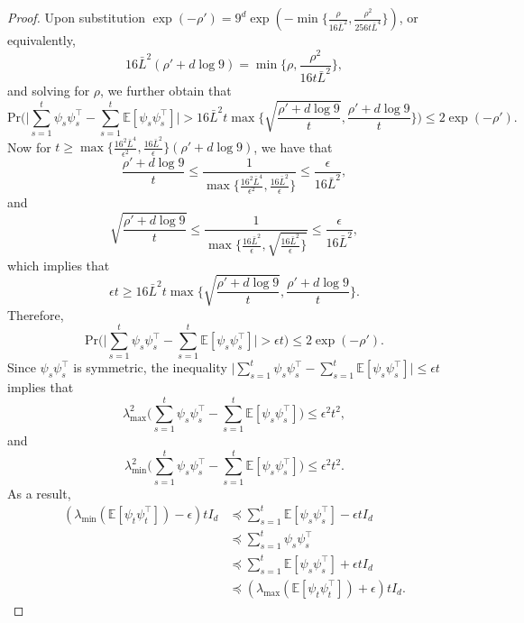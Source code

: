 \documentclass[11pt]{article}
\theoremstyle{plain}
\theoremstyle{definition}
\theoremstyle{remark}
\begin{document}
\begin{proof}
Upon substitution $\exp(-\rho')=9^d\exp (-\min \{\frac{\rho}{16 \bar L^2},\frac{\rho^2}{256t \bar L^4}\})$, or equivalently,
\[
16 \bar L^2 (\rho'+d \log 9)=\min\bigg \{\rho,\frac{\rho^2}{16 t \bar L^2} \bigg \},
\]
and solving for $\rho$, we further obtain that
\[
\mathrm{Pr}\bigg(\bigg|\sum_{s=1}^t \psi_s \psi_s^{\top} - \sum_{s=1}^t  \mathbb{E}[\psi_s \psi_s^{\top}]\bigg|> 16 \bar{L}^2 t\max \bigg \{\sqrt{\frac{\rho'+d \log 9}{t}},\frac{\rho'+d \log 9}{t}\bigg \}\bigg)\leq 2\exp(-\rho').
\]
Now for $t \geq \max \{\frac{16^2\bar{L}^4}{\epsilon^2}, \frac{16\bar{L}^2}{\epsilon}\}(\rho' +d \log 9)$, we have that
\[
\frac{\rho'+d\log 9}{t} \leq \frac{1}{\max \Big\{\frac{16^2 \bar L^4}{\epsilon^2},\frac{16 \bar L^2}{\epsilon}\Big\}}\leq \frac{\epsilon}{16 \bar L^2},
\]
and
\[
\sqrt{\frac{\rho'+d\log 9}{t}} \leq \frac{1}{\max \Big \{\frac{16 \bar L^2}{\epsilon},\sqrt{\frac{16 \bar L^2}{\epsilon}\Big\}}}\leq \frac{\epsilon}{16 \bar L^2},
\]
which implies that
\[
\epsilon t \geq 16 \bar{L}^2 t\max \bigg\{\sqrt{\frac{\rho'+d \log 9}{t}},\frac{\rho'+d \log 9}{t}\bigg\}.
\]
Therefore,
\[
\mathrm{Pr}\bigg(\bigg|\sum_{s=1}^t \psi_s \psi_s^{\top} - \sum_{s=1}^t  \mathbb{E}[\psi_s \psi_s^{\top}]\bigg|> \epsilon t\bigg)\leq 2\exp(-\rho').
\]
Since $\psi_s \psi_s^{\top}$ is symmetric, the inequality $\big|\sum_{s=1}^t \psi_s \psi_s^{\top} - \sum_{s=1}^t  \mathbb{E}[\psi_s \psi_s^{\top}]\big|\leq \epsilon t$ implies that
\[
\lambda_{\max}^2 \bigg (\sum_{s=1}^t \psi_s \psi_s^{\top} - \sum_{s=1}^t  \mathbb{E}[\psi_s \psi_s^{\top}]\bigg )\leq \epsilon^2 t^2,
\]
and
\[
\lambda_{\min}^2 \bigg (\sum_{s=1}^t \psi_s \psi_s^{\top} - \sum_{s=1}^t  \mathbb{E}[\psi_s \psi_s^{\top}]\bigg )\leq \epsilon^2 t^2.
\]
As a result, 
\begin{align*}
(\lambda_{\min}(\mathbb{E}[\psi_t \psi_t^{\top}])- \epsilon)tI_d&\preceq \sum_{s=1}^t\mathbb{E}[\psi_s \psi_s^{\top}]-\epsilon t I_d\\
&\preceq \sum_{s=1}^t \psi_s \psi_s^{\top}\\
&\preceq \sum_{s=1}^t\mathbb{E}[\psi_s \psi_s^{\top}] + \epsilon t I_d\\
&\preceq (\lambda_{\max}(\mathbb{E}[\psi_t \psi_t^{\top}])+ \epsilon)tI_d.
\end{align*}
\end{proof}
\end{document}
